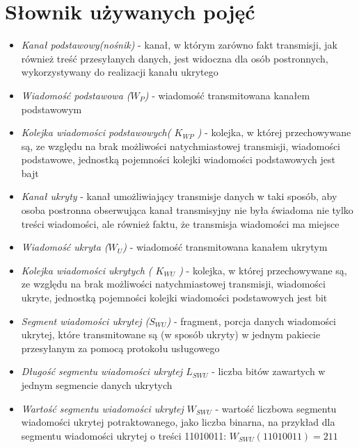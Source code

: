 \documentclass[a4paper, twoside, 12pt]{report}
\begin{document}
    \section{Słownik używanych pojęć} \label{DICT}
    \begin{itemize}
        \item \emph{Kanał podstawowy(nośnik)} - kanał, w którym zarówno fakt transmisji,
            jak również treść przesyłanych danych, jest widoczna dla osób postronnych,
            wykorzystywany do realizacji kanału ukrytego

        \item \emph{Wiadomość podstawowa (\(W_P\))} - wiadomość transmitowana kanałem
            podstawowym

        \item \emph{Kolejka wiadomości podstawowych( \( K_{WP} \) )} - kolejka, w
                której przechowywane są, ze względu na brak możliwości natychmiastowej
                transmisji, wiadomości podstawowe, jednostką pojemności kolejki
                wiadomości podstawowych jest bajt

        \item \emph{Kanał ukryty} - kanał umożliwiający transmisje danych w taki sposób,
            aby osoba postronna obserwująca kanał transmisyjny nie była świadoma
            nie tylko treści wiadomości, ale również faktu, że transmisja wiadomości ma miejsce

        \item \emph{Wiadomość ukryta (\(W_U\))} - wiadomość transmitowana kanałem ukrytym

        \item \emph{Kolejka wiadomości ukrytych ( \( K_{WU} \) )} - kolejka, w
                której przechowywane są, ze względu na brak możliwości natychmiastowej
                transmisji, wiadomości ukryte, jednostką pojemności kolejki
                wiadomości podstawowych jest bit

        \item \emph{Segment wiadomości ukrytej (\(S_{WU}\))} - fragment, porcja danych
            wiadomości ukrytej, które transmitowane są (w sposób ukryty) w jednym
            pakiecie przesyłanym za pomocą protokołu usługowego

        \item \emph{Długość segmentu wiadomości ukrytej \( L_{SWU} \)} - liczba
                bitów zawartych w jednym segmencie danych ukrytych

        \item \emph{Wartość segmentu wiadomości ukrytej \( W_{SWU} \)} - wartość
            liczbowa segmentu wiadomości ukrytej potraktowanego, jako liczba binarna,
            na przykład dla segmentu wiadomości ukrytej o treści 11010011:
            \( W_{SWU}(11010011) = 211 \)


\end{itemize}
\end{document}
